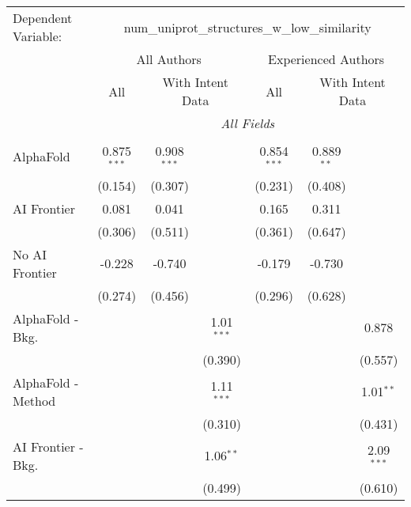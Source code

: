 \begingroup
\centering
\begin{tabular}{lcccccc}
   \tabularnewline \midrule \midrule
   Dependent Variable: & \multicolumn{6}{c}{num\_uniprot\_structures\_w\_low\_similarity}\\
 & \multicolumn{3}{c}{All Authors} & \multicolumn{3}{c}{Experienced Authors} \\
\cmidrule(lr){2-4} \cmidrule(lr){5-7}
 & \multicolumn{1}{c}{All} & \multicolumn{2}{c}{With Intent Data} & \multicolumn{1}{c}{All} & \multicolumn{2}{c}{With Intent Data} \\
\cmidrule(lr){2-2} \cmidrule(lr){3-4} \cmidrule(lr){5-5} \cmidrule(lr){6-7}
 & \multicolumn{6}{c}{\textit{All Fields}} \\ \\
   AlphaFold               & 0.875$^{***}$ & 0.908$^{***}$ &              & 0.854$^{***}$ & 0.889$^{**}$ &   \\   
                           & (0.154)       & (0.307)       &              & (0.231)       & (0.408)      &   \\   
   AI Frontier             & 0.081         & 0.041         &              & 0.165         & 0.311        &   \\   
                           & (0.306)       & (0.511)       &              & (0.361)       & (0.647)      &   \\   
   No AI Frontier          & -0.228        & -0.740        &              & -0.179        & -0.730       &   \\   
                           & (0.274)       & (0.456)       &              & (0.296)       & (0.628)      &   \\   
   AlphaFold - Bkg.        &               &               & 1.01$^{***}$ &               &              & 0.878\\   
                           &               &               & (0.390)      &               &              & (0.557)\\   
   AlphaFold - Method      &               &               & 1.11$^{***}$ &               &              & 1.01$^{**}$\\   
                           &               &               & (0.310)      &               &              & (0.431)\\   
   AI Frontier - Bkg.      &               &               & 1.06$^{**}$  &               &              & 2.09$^{***}$\\   
                           &               &               & (0.499)      &               &              & (0.610)\\   

\end{tabular}
